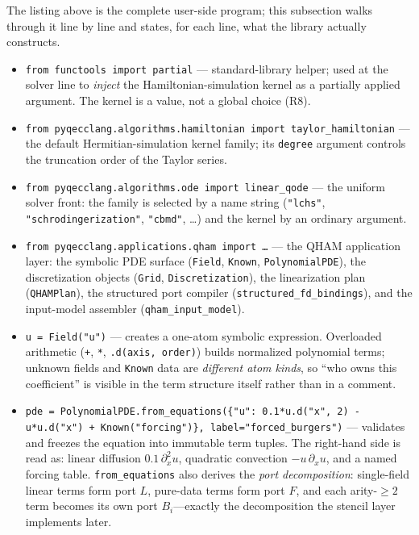 The listing above is the complete user-side program; this subsection walks
through it line by line and states, for each line, what the library
actually constructs.

\begin{itemize}
\item \texttt{from functools import partial} --- standard-library helper;
  used at the solver line to \emph{inject} the Hamiltonian-simulation kernel
  as a partially applied argument.  The kernel is a value, not a global
  choice (R8).
\item \texttt{from pyqecclang.algorithms.hamiltonian import
  taylor\_hamiltonian} --- the default Hermitian-simulation kernel family;
  its \texttt{degree} argument controls the truncation order of the Taylor
  series.
\item \texttt{from pyqecclang.algorithms.ode import linear\_qode} --- the
  uniform solver front: the family is selected by a name string
  (\texttt{"lchs"}, \texttt{"schrodingerization"}, \texttt{"cbmd"},
  \dots) and the kernel by an ordinary argument.
\item \texttt{from pyqecclang.applications.qham import \dots} --- the QHAM
  application layer: the symbolic PDE surface (\texttt{Field},
  \texttt{Known}, \texttt{PolynomialPDE}), the discretization objects
  (\texttt{Grid}, \texttt{Discretization}), the linearization plan
  (\texttt{QHAMPlan}), the structured port compiler
  (\texttt{structured\_fd\_bindings}), and the input-model assembler
  (\texttt{qham\_input\_model}).
\item \texttt{u = Field("u")} --- creates a one-atom symbolic expression.
  Overloaded arithmetic (\texttt{+}, \texttt{*}, \texttt{.d(axis, order)})
  builds normalized polynomial terms; unknown fields and \texttt{Known}
  data are \emph{different atom kinds}, so ``who owns this coefficient''
  is visible in the term structure itself rather than in a comment.
\item \texttt{pde = PolynomialPDE.from\_equations(\{"u": 0.1*u.d("x", 2) -
  u*u.d("x") + Known("forcing")\}, label="forced\_burgers")} --- validates
  and freezes the equation into immutable term tuples.  The right-hand side
  is read as: linear diffusion $0.1\,\partial_x^2 u$, quadratic convection
  $-u\,\partial_x u$, and a named forcing table.
  \texttt{from\_equations} also derives the \emph{port decomposition}:
  single-field linear terms form port $L$, pure-data terms form port $F$,
  and each arity-$\ge 2$ term becomes its own port $B_i$---exactly the
  decomposition the stencil layer implements later.

\end{itemize}
